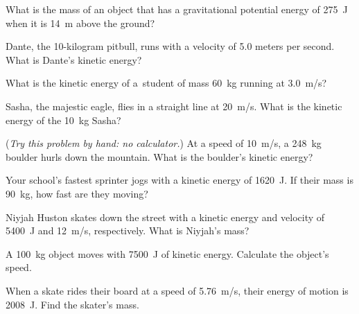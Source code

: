 \documentclass[main.tex]{subfiles}
\begin{document}
\begin{exercise} \label{JangCo}
    What is the mass of an object that has a gravitational potential energy of \SI{275}{J} when it is \SI{14}{m} above the ground?
\end{exercise}

\cyanhrule


\begin{exercise} \label{taHSMX}
    Dante, the 10-kilogram pitbull, runs with a velocity of 5.0 meters per second. What is Dante's kinetic energy?
\end{exercise}


\begin{exercise} \label{QRI2H9}
    What is the kinetic energy of a student of mass \SI{60}{kg} running at \SI{3.0}{m/s}?
\end{exercise}


\begin{exercise} \label{ixc46e}
    Sasha, the majestic eagle, flies in a straight line at \SI{20}{m/s}. What is the kinetic energy of the \SI{10}{kg} Sasha? 
\end{exercise}


\begin{exercise} \label{dguWEr}
    (\textit{Try this problem by hand: no calculator.}) At a speed of \SI{10}{m/s}, a \SI{248}{kg} boulder hurls down the mountain. What is the boulder's kinetic energy?
\end{exercise}

\begin{exercise} \label{rUr2P8}
    Your school's fastest sprinter jogs with a kinetic energy of \SI{1620}{J}. If their mass is \SI{90}{kg}, how fast are they moving?
\end{exercise}

\begin{exercise} \label{2rrR9W}
    Niyjah Huston skates down the street with a kinetic energy and velocity of \SI{5400}{J} and \SI{12}{m/s}, respectively. What is Niyjah's mass?
\end{exercise}

\begin{exercise} \label{gHlhnM}
    A \SI{100}{kg} object moves with \SI{7500}{J} of kinetic energy. Calculate the object's speed.
\end{exercise}

\begin{exercise} \label{WH6xot}
    When a skate rides their board at a speed of \SI{5.76}{m/s}, their energy of motion is \SI{2008}{J}. Find the skater's mass.
\end{exercise}
\end{document}

